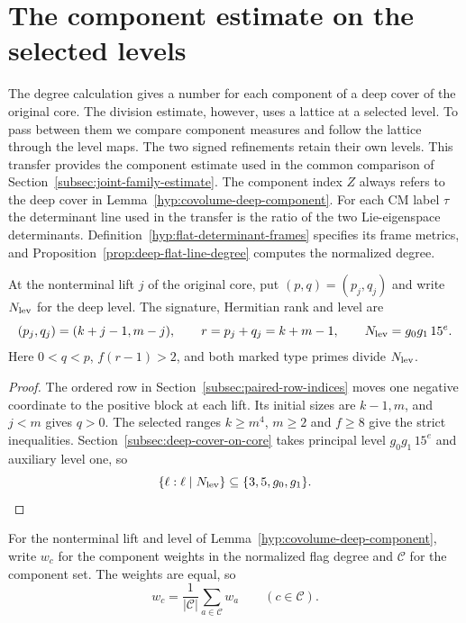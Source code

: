 \section{The component estimate on the selected levels}
\label{sec:flag-component-transfer}

The degree calculation gives a number for each component of a deep cover of the
original core. The division estimate, however, uses a lattice at a selected level. To
pass between them we compare component measures and follow the lattice through the
level maps. The two signed
refinements retain their own levels. This transfer provides the
component estimate used in the common comparison of
Section~\ref{subsec:joint-family-estimate}. The component index
\(Z\) always refers to the deep cover in
Lemma~\ref{hyp:covolume-deep-component}. For each CM label \(\tau\)
the determinant line used in the transfer is the ratio of the two
Lie-eigenspace determinants. Definition~\ref{hyp:flat-determinant-frames}
specifies its frame metrics, and Proposition~\ref{prop:deep-flat-line-degree}
computes the normalized degree.

\begin{established}\label{hyp:covolume-deep-component}
At the nonterminal lift \(j\) of the original core, put
\((p,q)=(p_j,q_j)\) and write \(N_{\rm lev}\) for the deep level.
The signature, Hermitian rank and level are
\[
 (p_j,q_j)=(k+j-1,m-j),\qquad r=p_j+q_j=k+m-1,\qquad
 N_{\rm lev}=g_0g_1\,15^e .
\]
Here \(0<q<p\), \(f(r-1)>2\), and both marked type primes divide
\(N_{\rm lev}\).
\end{established}
\begin{proof}
The ordered row in Section~\ref{subsec:paired-row-indices} moves one
negative coordinate to the positive block at each lift. Its initial
sizes are \(k-1,m\), and \(j<m\) gives \(q>0\). The selected
ranges \(k\ge m^4\), \(m\ge 2\) and \(f\ge8\) give the strict
inequalities. Section~\ref{subsec:deep-cover-on-core} takes principal
level \(g_0g_1\,15^e\) and auxiliary level one, so
\[
 \{\ell:\ell\mid N_{\rm lev}\}\subseteq\{3,5,g_0,g_1\}.
\]
\end{proof}

\begin{lemma}\label{lem:deep-component-measures}
For the nonterminal lift and level of
Lemma~\ref{hyp:covolume-deep-component}, write \(w_c\) for the component weights in the normalized flag degree and \(\mathcal C\) for the component set. The weights are equal, so
\[
 w_c=\frac1{|\mathcal C|}\sum_{a\in\mathcal C}w_a\qquad(c\in\mathcal C).
\]

\end{lemma}


